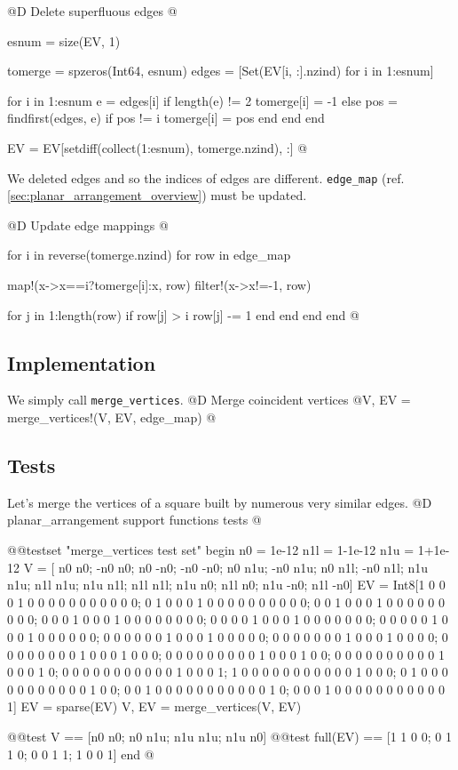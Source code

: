 @D Delete superfluous edges
@{esnum = size(EV, 1)

tomerge = spzeros(Int64, esnum)
edges = [Set(EV[i, :].nzind) for i in 1:esnum]

for i in 1:esnum
    e = edges[i]
    if length(e) != 2
        tomerge[i] = -1
    else
        pos = findfirst(edges, e)
        if pos != i
            tomerge[i] = pos
        end
    end
end

EV = EV[setdiff(collect(1:esnum), tomerge.nzind), :]
@}

We deleted edges and so the indices of edges are different.
\texttt{edge\_map} (ref. \ref{sec:planar_arrangement_overview})
must be updated.

@D Update edge mappings
@{
for i in reverse(tomerge.nzind)
    for row in edge_map

        map!(x->x==i?tomerge[i]:x, row)
        filter!(x->x!=-1, row)

        for j in 1:length(row)
            if row[j] > i
                row[j] -= 1
            end
        end
    end
end
@}

\subsection{Implementation}
We simply call \texttt{merge\_vertices}.
@D Merge coincident vertices
@{V, EV = merge_vertices!(V, EV, edge_map)
@}
\subsection{Tests}
Let's merge the vertices of a square built by numerous
very similar edges.
@D planar\_arrangement support functions tests
@{@@testset "merge_vertices test set" begin
    n0 = 1e-12
    n1l = 1-1e-12
    n1u = 1+1e-12
    V = [ n0  n0; -n0  n0;  n0 -n0; -n0 -n0;
          n0 n1u; -n0 n1u;  n0 n1l; -n0 n1l;
         n1u n1u; n1l n1u; n1u n1l; n1l n1l;
         n1u  n0; n1l  n0; n1u -n0; n1l -n0]
    EV = Int8[1 0 0 0 1 0 0 0 0 0 0 0 0 0 0 0;
              0 1 0 0 0 1 0 0 0 0 0 0 0 0 0 0;
              0 0 1 0 0 0 1 0 0 0 0 0 0 0 0 0;
              0 0 0 1 0 0 0 1 0 0 0 0 0 0 0 0;
              0 0 0 0 1 0 0 0 1 0 0 0 0 0 0 0;
              0 0 0 0 0 1 0 0 0 1 0 0 0 0 0 0;
              0 0 0 0 0 0 1 0 0 0 1 0 0 0 0 0;
              0 0 0 0 0 0 0 1 0 0 0 1 0 0 0 0;
              0 0 0 0 0 0 0 0 1 0 0 0 1 0 0 0;
              0 0 0 0 0 0 0 0 0 1 0 0 0 1 0 0;
              0 0 0 0 0 0 0 0 0 0 1 0 0 0 1 0;
              0 0 0 0 0 0 0 0 0 0 0 1 0 0 0 1;
              1 0 0 0 0 0 0 0 0 0 0 0 1 0 0 0;
              0 1 0 0 0 0 0 0 0 0 0 0 0 1 0 0;
              0 0 1 0 0 0 0 0 0 0 0 0 0 0 1 0;
              0 0 0 1 0 0 0 0 0 0 0 0 0 0 0 1]
    EV = sparse(EV)
    V, EV = merge_vertices(V, EV)

    @@test V == [n0 n0; n0 n1u; n1u n1u; n1u n0]
    @@test full(EV) == [1 1 0 0;
                       0 1 1 0;
                       0 0 1 1;
                       1 0 0 1]
end
@}








